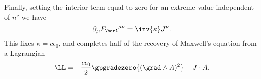 Finally, setting the interior term equal to zero for an extreme value independent of \(n^{\nu}\) we have
%
\begin{equation}\label{eqn:lagrangianFieldDensity:1514}
\partial_{\mu} {F_{\barA}}^{\mu\nu} = \inv{\kappa} J^{\nu}.
\end{equation}
%
This fixes \(\kappa = c \epsilon_0\), and completes half of the recovery of Maxwell's equation from a Lagrangian
%
\begin{equation}
\LL = -\frac{c \epsilon_0}{2} \gpgradezero{(\grad \wedge A)^2} + J \cdot A.
\end{equation}
%
%
%
%
%
